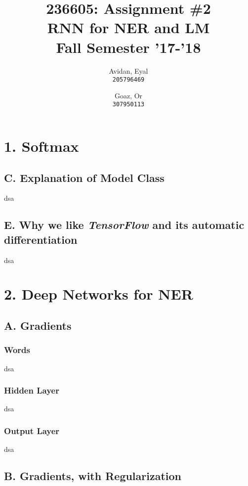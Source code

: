 \documentclass{article}
\begin{document}
\title{%
  236605: Assignment \#2 \\
  \large RNN for NER and LM \\
    Fall Semester '17-'18}

\author{
  Avidan, Eyal \\
  \texttt{205796469}
  \and
  Goaz, Or \\
  \texttt{307950113}
}

\maketitle

\section*{1. Softmax}
\subsection*{C. Explanation of Model Class}
dsa

\subsection*{E. Why we like \emph{TensorFlow} and its automatic differentiation}
dsa


\section*{2. Deep Networks for \textbf{NER}}
\subsection*{A. Gradients}
\subsubsection*{Words}
dsa

\subsubsection*{Hidden Layer}
dsa

\subsubsection*{Output Layer}
dsa


\subsection*{B. Gradients, with Regularization}
\end{document}
